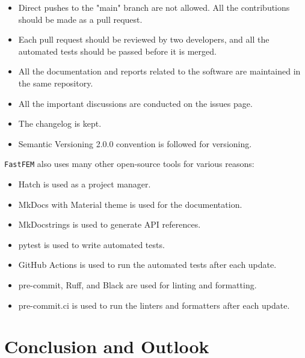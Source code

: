 \documentclass[headings=standardclasses, abstract=true]{scrartcl}
\begin{document}
\begin{itemize}
    \item Direct pushes to the "main" branch are not allowed. All the contributions should be made as a pull request.
    \item Each pull request should be reviewed by two developers, and all the automated tests should be passed before it is merged.
    \item All the documentation and reports related to the software are maintained in the same repository.
    \item All the important discussions are conducted on the issues page.
    \item The changelog is kept.
    \item Semantic Versioning 2.0.0\supercite{semanticVersioning} convention is followed for versioning.
\end{itemize}

\texttt{FastFEM} also uses many other open-source tools for various reasons:
\begin{itemize}
    \item Hatch\supercite{hatch} is used as a project manager.
    \item MkDocs\supercite{mkdocs} with Material theme\supercite{mkdocsmaterial} is used for the documentation.
    \item MkDocstrings\supercite{mkdocstrings} is used to generate API references.
    \item pytest\supercite{pytest} is used to write automated tests.
    \item GitHub Actions\supercite{githubactions} is used to run the automated tests after each update.
    \item pre-commit\supercite{precommit}, Ruff\supercite{ruff}, and Black\supercite{black} are used for linting and formatting.
    \item pre-commit.ci is used to run the linters and formatters after each update.
\end{itemize}


\section{Conclusion and Outlook}

\clearpage
\printbibliography
\end{document}
